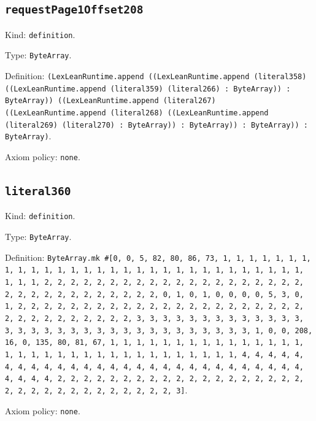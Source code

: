\documentclass[11pt]{article}
\begin{document}
\subsection*{\texttt{requestPage1Offset208}}
\noindent Kind: \texttt{definition}.\par
\noindent Type: \texttt{ByteArray}.\par
\noindent Definition: \texttt{(LexLeanRuntime.append ((LexLeanRuntime.append (literal358) ((LexLeanRuntime.append (literal359) (literal266) : ByteArray)) : ByteArray)) ((LexLeanRuntime.append (literal267) ((LexLeanRuntime.append (literal268) ((LexLeanRuntime.append (literal269) (literal270) : ByteArray)) : ByteArray)) : ByteArray)) : ByteArray)}.\par
\noindent Axiom policy: \texttt{none}.\par
\subsection*{\texttt{literal360}}
\noindent Kind: \texttt{definition}.\par
\noindent Type: \texttt{ByteArray}.\par
\noindent Definition: \texttt{ByteArray.mk \#[0, 0, 5, 82, 80, 86, 73, 1, 1, 1, 1, 1, 1, 1, 1, 1, 1, 1, 1, 1, 1, 1, 1, 1, 1, 1, 1, 1, 1, 1, 1, 1, 1, 1, 1, 1, 1, 1, 1, 1, 2, 2, 2, 2, 2, 2, 2, 2, 2, 2, 2, 2, 2, 2, 2, 2, 2, 2, 2, 2, 2, 2, 2, 2, 2, 2, 2, 2, 2, 2, 2, 2, 0, 1, 0, 1, 0, 0, 0, 0, 5, 3, 0, 1, 2, 2, 2, 2, 2, 2, 2, 2, 2, 2, 2, 2, 2, 2, 2, 2, 2, 2, 2, 2, 2, 2, 2, 2, 2, 2, 2, 2, 2, 2, 2, 2, 3, 3, 3, 3, 3, 3, 3, 3, 3, 3, 3, 3, 3, 3, 3, 3, 3, 3, 3, 3, 3, 3, 3, 3, 3, 3, 3, 3, 3, 3, 3, 3, 1, 0, 0, 208, 16, 0, 135, 80, 81, 67, 1, 1, 1, 1, 1, 1, 1, 1, 1, 1, 1, 1, 1, 1, 1, 1, 1, 1, 1, 1, 1, 1, 1, 1, 1, 1, 1, 1, 1, 1, 1, 1, 1, 4, 4, 4, 4, 4, 4, 4, 4, 4, 4, 4, 4, 4, 4, 4, 4, 4, 4, 4, 4, 4, 4, 4, 4, 4, 4, 4, 4, 4, 4, 4, 4, 2, 2, 2, 2, 2, 2, 2, 2, 2, 2, 2, 2, 2, 2, 2, 2, 2, 2, 2, 2, 2, 2, 2, 2, 2, 2, 2, 2, 2, 2, 2, 2, 3]}.\par
\noindent Axiom policy: \texttt{none}.\par
\end{document}
